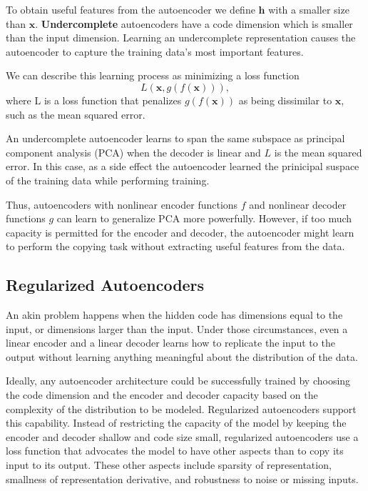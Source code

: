 To obtain useful features from the autoencoder we define $\textbf{h}$ with a smaller size
than $\textbf{x}$. \textbf{Undercomplete} autoencoders have a code dimension
which is smaller than the input dimension. Learning an undercomplete
representation causes the autoencoder to capture the training data's most
important features. 

We can describe this learning process as minimizing a loss function
\begin{equation}
    L(\textbf{x}, g(f(\textbf{x}))),
\end{equation}
where L is a loss function that penalizes $g(f(\textbf{x}))$ as being dissimilar
to $\textbf{x}$, such as the mean squared error. 

An undercomplete autoencoder learns to span the same subspace as principal
component analysis (PCA) when the decoder is linear and $L$ is the mean squared
error. In this case, as a side effect the autoencoder learned the prinicipal
suspace of the training data while performing training.

Thus, autoencoders with nonlinear encoder functions $f$ and nonlinear decoder
functions $g$ can learn to generalize PCA more powerfully. However, if too much
capacity is permitted for the encoder and decoder, the autoencoder might learn to
perform the copying task without extracting useful features from the data. 

\subsection{Regularized Autoencoders}
An akin problem happens when the hidden code has dimensions equal to the input,
or dimensions larger than the input. Under those circumstances, even a linear
encoder and a linear decoder learns how to replicate the input to the output
without learning anything meaningful about the distribution of the data. 

Ideally, any autoencoder architecture could be successfully trained by choosing
the code dimension and the encoder and decoder capacity based on the complexity
of the distribution to be modeled. Regularized autoencoders support this
capability. Instead of restricting the capacity of the model by keeping the
encoder and decoder shallow and code size small, regularized autoencoders use a
loss function that advocates the model to have other aspects than to copy its
input to its output. These other aspects include sparsity of representation,
smallness of representation derivative, and robustness to noise or missing
inputs. 

